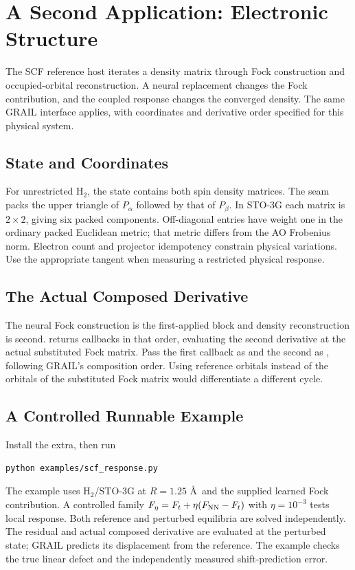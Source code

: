 \chapter{A Second Application: Electronic Structure}
\label{ch:scf}
The SCF reference host iterates a density matrix through Fock construction
and occupied-orbital reconstruction. A neural replacement changes the Fock
contribution, and the coupled response changes the converged density.
The same GRAIL interface applies, with coordinates and derivative order
specified for this physical system.

\section{State and Coordinates}
For unrestricted H$_2$, the state contains both spin density matrices.
The seam packs the upper triangle of $P_\alpha$ followed by that of
$P_\beta$. In STO-3G each matrix is $2\times2$, giving six packed
components. Off-diagonal entries have weight one in the ordinary packed
Euclidean metric; that metric differs from the AO Frobenius norm.
Electron count and projector idempotency constrain physical variations.
Use the appropriate tangent when measuring a restricted physical response.

\section{The Actual Composed Derivative}
The neural Fock construction is the first-applied block and density
reconstruction is second.  returns callbacks
in that order, evaluating the second derivative at the actual substituted
Fock matrix. Pass the first callback as  and the second
as , following GRAIL's composition order.
Using reference orbitals instead of the orbitals of the substituted Fock
matrix would differentiate a different cycle.

\section{A Controlled Runnable Example}
Install the  extra, then run
\begin{lstlisting}[style=grailInStyle]
python examples/scf_response.py
\end{lstlisting}
The example uses H$_2$/STO-3G at $R=1.25$ \AA\ and the supplied learned
Fock contribution. A controlled family
$F_\eta=F_t+\eta(F_{\rm NN}-F_t)$ with $\eta=10^{-3}$ tests local response.
Both reference and perturbed equilibria are solved independently.
The residual and actual composed derivative are evaluated at the perturbed
state; GRAIL predicts its displacement from the reference.
The example checks the true linear defect and the independently measured
shift-prediction error.

